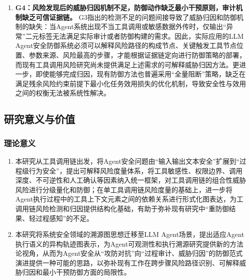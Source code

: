 \begin{enumerate}
  \item \textbf{G4：风险发现后的威胁归因机制不足，防御动作缺乏最小干预原则，审计机制缺乏可信证据链。}
  G3指出的检测不足的问题间接导致了威胁归因和防御机制的缺失：当Agent系统出现不当工具调用或敏感数据外传时，仅输出“异常”二元标签无法满足实际审计或者防御构建的需求。因此，实际应用的LLM Agent安全防御系统必须可以解释风险路径的构成节点、关键触发工具节点位置、参数来源、风险最高的步骤，才能根据证据链定向进行防御策略的部署，而现有工具调用风险研究\cite{he2025sentinelagent,wang2026aligning,wang2026agenttrace,li2026traces}尚未提供满足上述需求的可解释威胁归因方法。更进一步，即使能够完成归因，现有防御方法也普遍采用“全量阻断”策略，缺乏在满足残余风险约束前提下最小化任务效用损失的优化机制，导致安全性与效用之间的权衡无法被系统性解决\cite{deng2025agentsunderthreat,balunovic2024agentdojo}。
  
\end{enumerate}

\subsection{研究意义与价值}

\subsubsection{理论意义}

\begin{enumerate}
  \item 本研究从工具调用链出发，将Agent安全问题由“输入输出文本安全”扩展到“过程级行为安全”，提出可解释风险度量体系，将工具敏感性、权限边界、调用深度、不可逆性和人工确认等因素纳入统一框架，对工具调用链的组合性威胁风险进行分级量化和防御；在单工具调用链风险度量的基础上，进一步将Agent执行过程中的工具上下文元素之间的依赖关系进行形式化图表达，为工调用链风险检测和归因提供结构化基础，有助于弥补现有研究中“重防御结果、轻过程感知”的不足。

  \item 本研究将系统安全领域的溯源图思想\cite{inam2023sok,gao2021threatraptor,cheng2024kairos}迁移至LLM Agent场景，提出适应Agent执行语义的异构轨迹图表示，为Agent可观测性和执行溯源研究提供新的方法论视角，从而为Agent安全从“攻防对抗”向“过程审计、威胁归因”的防御范式演进提供一种可能的思路，以弥补现有工作\cite{dewitt2026openchallenges,he2025sentinelagent,wang2026aligning,wang2026agenttrace,hong2026trace,li2026traces,liu2026auditing}在跨步骤风险路径识别、可解释威胁归因和最小干预防御方面的局限性。
\end{enumerate}

